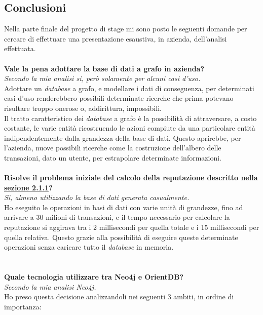 \subsection{Conclusioni}
Nella parte finale del progetto di stage mi sono posto le seguenti domande per cercare di effettuare una presentazione esaustiva, in azienda, dell'analisi effettuata.\\
\\
\textbf{Vale la pena adottare la base di dati a grafo in azienda?}\\
\textit{Secondo la mia analisi si, però solamente per alcuni casi d'uso.}\\
Adottare un \textit{database} a grafo, e modellare i dati di conseguenza, per determinati casi d'uso renderebbero possibili determinate ricerche che prima potevano risultare troppo onerose o, addirittura, impossibili.\\
Il tratto caratteristico dei \textit{database} a grafo è la possibilità di attraversare, a costo costante, le varie entità ricostruendo le azioni compiute da una particolare entità indipendentemente dalla grandezza della base di dati. Questo aprirebbe, per l'azienda, nuove possibili ricerche come la costruzione dell'albero delle transazioni, dato un utente, per estrapolare determinate informazioni.\\
\\
\textbf{Risolve il problema iniziale del calcolo della reputazione descritto nella \hyperlink{sec:prob}{sezione 2.1.1}?}\\
\textit{Si, almeno utilizzando la base di dati generata casualmente.}\\
Ho eseguito le operazioni in basi di dati con varie unità di grandezze, fino ad arrivare a 30 milioni di transazioni, e il tempo necessario per calcolare la reputazione si aggirava tra i 2 millisecondi per quella totale e i 15 millisecondi per quella relativa. Questo grazie alla possibilità di eseguire queste determinate operazioni senza caricare tutto il \textit{database} in memoria.\\
\\
\\
\textbf{Quale tecnologia utilizzare tra Neo4j e OrientDB?}\\
\textit{Secondo la mia analisi Neo4j.}\\
Ho preso questa decisione analizzandoli nei seguenti 3 ambiti, in ordine di importanza:
